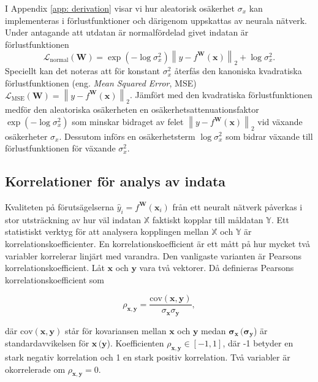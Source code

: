 I Appendix \ref{app: derivation} visar vi hur aleatorisk osäkerhet $\sigma_x$ kan implementeras i förlustfunktioner och därigenom uppskattas av neurala nätverk. Under antagande att utdatan är normalfördelad givet indatan är förlustfunktionen
\begin{equation}
    \mathcal{L}_{\mathrm{normal}}(\mathbf{W}) = \exp{\left(-\log \sigma_x^2 \right)} \left\|y - f^\mathbf{W}(\mathbf{x})\right\|_2 + \log \sigma_x^2.
    \label{eq:loss_fcn}
\end{equation}
Speciellt kan det noteras att för konstant $\sigma_x^2$ återfås den kanoniska kvadratiska förlustfunktionen (eng. \emph{Mean Squared Error}, MSE) $\mathcal{L}_\mathrm{MSE}(\mathbf{W}) = \left\|y - f^\mathbf{W}(\mathbf{x})\right\|_2$. Jämfört med den kvadratiska förlustfunktionen medför den aleatoriska osäkerheten en osäkerhetsattenuationsfaktor $\exp{\left(-\log \sigma_x^2 \right)}$ som minskar bidraget av felet $\left\|y - f^\mathbf{W}(\mathbf{x})\right\|_2$ vid växande osäkerheter $\sigma_x$. Dessutom införs en osäkerhetsterm $\log \sigma_x^2$ som bidrar växande till förlustfunktionen för växande $\sigma_x^2$.

\subsection{Korrelationer för analys av indata}
\label{sec:korre}
Kvaliteten på förutsägelserna $\hat{y}_i = f^\mathbf{W}(\mathbf{x}_i)$ från ett neuralt nätverk påverkas i stor utsträckning av hur väl indatan $\mathbb{X}$ faktiskt kopplar till måldatan $\mathbb{Y}$. Ett statistiskt verktyg för att analysera kopplingen mellan $\mathbb{X}$ och $\mathbb{Y}$ är korrelationskoefficienter. En korrelationskoefficient är ett mått på hur mycket två variabler korrelerar linjärt med varandra. Den vanligaste varianten är Pearsons korrelationskoefficient. Låt $\mathbf{x}$ och $\mathbf{y}$ vara två vektorer. Då definieras Pearsons korrelationskoefficient som \cite{ProbStat}

\begin{equation}
    \rho_{\mathbf{x},\mathbf{y}} = \frac{\text{cov}(\mathbf{x,y})}{\sigma_\mathbf{x}\sigma_\mathbf{y}},
\end{equation}

\noindent
där $\text{cov}(\mathbf{x,y})$ står för kovariansen mellan $\mathbf{x}$ och $\mathbf{y}$ medan $\mathbf{\sigma}_\mathbf{x} \, (\mathbf{\sigma}_\mathbf{y}$) är standardavvikelsen för $\mathbf{x} \, (\mathbf{y}$). Koefficienten $\rho_{\mathbf{x},\mathbf{y}} \in [-1,1]$, där -1 betyder en stark negativ korrelation och 1 en stark positiv korrelation. Två variabler är okorrelerade om $\rho_{\mathbf{x},\mathbf{y}} = 0$. 

